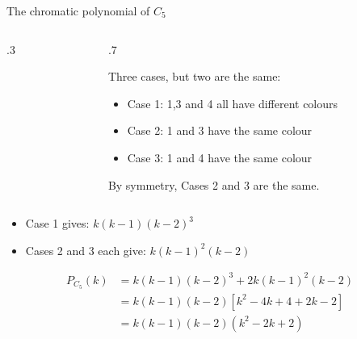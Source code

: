 \documentclass{beamer}
\begin{document}
\begin{frame}{The chromatic polynomial of $C_5$}
  \begin{columns}
    \begin{column}{.3\textwidth}
    \end{column}

    \begin{column}{.7\textwidth}
      \begin{block}{Three cases, but two are the same:}
        \begin{itemize}
        \item Case 1: 1,3 and 4 all have different colours
        \item Case 2: 1 and 3 have the same colour
        \item Case 3: 1 and 4 have the same colour
        \end{itemize}
        By symmetry, Cases 2 and 3 are the same.
      \end{block}
    \end{column}
    \end{columns}
  \begin{itemize}
  \item Case 1 gives: $k(k-1)(k-2)^3$
  \item Cases 2 and 3 each give: $k(k-1)^2(k-2)$
  \end{itemize}
\begin{align*}
  P_{C_5}(k)&=k(k-1)(k-2)^3+2k(k-1)^2(k-2) \\
  &=k(k-1)(k-2)\left[k^2-4k+4+2k-2\right] \\
  &=k(k-1)(k-2)(k^2-2k+2)
  \end{align*}

  \end{frame}
\end{document}
